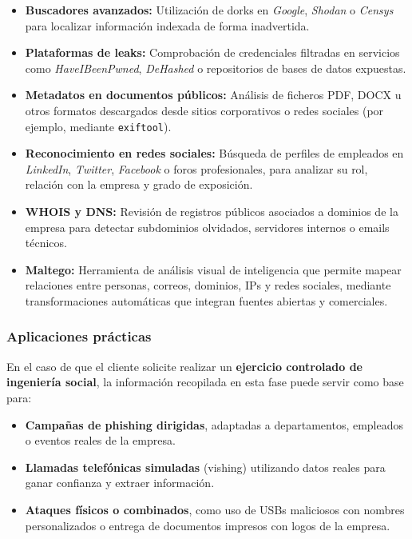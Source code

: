 \documentclass[a4paper, 11pt]{article}
\begin{document}
\begin{itemize}
    \item \textbf{Buscadores avanzados:} Utilización de dorks en \textit{Google}, \textit{Shodan} o \textit{Censys} para localizar información indexada de forma inadvertida.
    \item \textbf{Plataformas de leaks:} Comprobación de credenciales filtradas en servicios como \textit{HaveIBeenPwned}, \textit{DeHashed} o repositorios de bases de datos expuestas.
    \item \textbf{Metadatos en documentos públicos:} Análisis de ficheros PDF, DOCX u otros formatos descargados desde sitios corporativos o redes sociales (por ejemplo, mediante \texttt{exiftool}).
    \item \textbf{Reconocimiento en redes sociales:} Búsqueda de perfiles de empleados en \textit{LinkedIn}, \textit{Twitter}, \textit{Facebook} o foros profesionales, para analizar su rol, relación con la empresa y grado de exposición.
    \item \textbf{WHOIS y DNS:} Revisión de registros públicos asociados a dominios de la empresa para detectar subdominios olvidados, servidores internos o emails técnicos.
    \item \textbf{Maltego:} Herramienta de análisis visual de inteligencia que permite mapear relaciones entre personas, correos, dominios, IPs y redes sociales, mediante transformaciones automáticas que integran fuentes abiertas y comerciales.
\end{itemize}

\vspace{0.5cm}
\subsubsection*{Aplicaciones prácticas}

En el caso de que el cliente solicite realizar un \textbf{ejercicio controlado de ingeniería social}, la información recopilada en esta fase puede servir como base para:

\begin{itemize}
    \item \textbf{Campañas de phishing dirigidas}, adaptadas a departamentos, empleados o eventos reales de la empresa.
    \item \textbf{Llamadas telefónicas simuladas} (vishing) utilizando datos reales para ganar confianza y extraer información.
    \item \textbf{Ataques físicos o combinados}, como uso de USBs maliciosos con nombres personalizados o entrega de documentos impresos con logos de la empresa.
\end{itemize}
\end{document}
